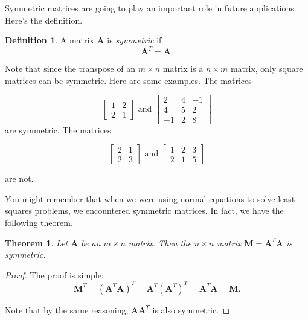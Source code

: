 \documentclass[
]{book}
\newtheorem{theorem}{Theorem}[chapter]
\theoremstyle{definition}
\newtheorem{definition}{Definition}[chapter]
\theoremstyle{definition}
\theoremstyle{definition}
\theoremstyle{definition}
\theoremstyle{remark}
\begin{document}
Symmetric matrices are going to play an important role in future applications. Here's the definition.

\begin{defbox}

\begin{definition}
A matrix \(\mathbf{A}\) is \emph{symmetric} if
\[\mathbf{A}^T=\mathbf{A}.\]
\end{definition}

\end{defbox}

Note that since the transpose of an \(m\times n\) matrix is a \(n\times m\) matrix, only square matrices can be symmetric. Here are some examples. The matrices

\[\begin{bmatrix}1 & 2\\2 & 1\end{bmatrix} \text{ and } \begin{bmatrix} 2 & 4 & -1\\4 & 5 & 2\\-1 & 2 & 8\end{bmatrix}\]
are symmetric. The matrices

\[\begin{bmatrix} 2 & 1\\2 & 3\end{bmatrix} \text{ and } \begin{bmatrix} 1 & 2 & 3\\2 & 1 & 5\end{bmatrix}\]

are not.

You might remember that when we were using normal equations to solve least squares problems, we encountered symmetric matrices. In fact, we have the following theorem.

\begin{theorembox}

\begin{theorem}
Let \(\mathbf{A}\) be an \(m\times n\) matrix. Then the \(n\times n\) matrix \(\mathbf{M}=\mathbf{A}^T\mathbf{A}\) is symmetric.
\end{theorem}

\end{theorembox}

\begin{proof}
The proof is simple:
\[\mathbf{M}^T=(\mathbf{A}^T\mathbf{A})^T=\mathbf{A}^T(\mathbf{A}^T)^T=\mathbf{A}^T\mathbf{A}=\mathbf{M}.\]

Note that by the same reasoning, \(\mathbf{A}\mathbf{A}^T\) is also symmetric.
\end{proof}
\end{document}
